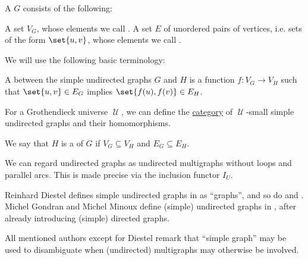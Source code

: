 \begin{definition}\label{def:undirected_graph}
  A  \( G \) consists of the following:
  \begin{thmenum}[series=def:undirected_graph]
     A set \( V_G \), whose elements we call .
     A set \( E \) of unordered pairs of  vertices, i.e. sets of the form \( \set{ u, v } \), whose elements we call .
  \end{thmenum}

  We will use the following basic terminology:
  \begin{thmenum}[resume=def:undirected_graph]
     A  between the simple undirected graphs \( G \) and \( H \) is a function \( f: V_G \to V_H \) such that \( \set{ u, v } \in E_G \) implies \( \set{ f(u), f(v) } \in E_H \).

     For a Grothendieck universe \( \mscrU \), we can define the \hyperref[def:category]{category} of \( \mscrU \)-small simple undirected graphs and their homomorphisms.

     We say that \( H \) is a  of \( G \) if \( V_G \subseteq V_H \) and \( E_G \subseteq E_H \).
  \end{thmenum}
\end{definition}
\begin{comments}
  \item We can regard undirected graphs as undirected multigraphs without loops and parallel arcs. This is made precise via the inclusion functor \hyperref[def:graph_functors/undirected_inclusion]{\( I_U \)}.

  \item Reinhard Diestel defines simple undirected graphs in \cite[2]{Diestel2005} as \enquote{graphs}, and so do  and . Michel Gondran and Michel Minoux define (simple) undirected graphs in \cite[3]{GondranMinoux1984Graphs}, after already introducing (simple) directed graphs.

  All mentioned authors except for Diestel remark that \enquote{simple graph} may be used to disambiguate when (undirected) multigraphs may otherwise be involved.
\end{comments}

